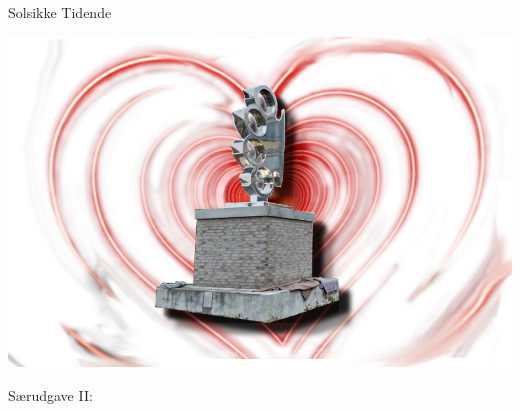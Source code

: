 \documentclass[danish]{article}
\def\papername{Solsikke Tidende}
\begin{document}
\begin{titlepage} %

	\raggedleft %
	
	\vspace*{\baselineskip} %


\begin{center}
  {\textgoth
   {\Huge 
      \papername
   }
  }	
\end{center}
\vspace{50px} 
	

\begin{center}
           \includegraphics[scale=2.2]{knojern-of-love}
\end{center}



\vspace{50px} 

          {
              \setmainfont{Ink Free} 
                   {\huge Særudgave II:}
           }



\vspace*{3\baselineskip} %

\end{titlepage}
\end{document}
